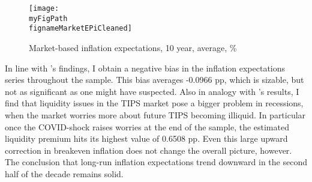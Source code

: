 \documentclass[11pt]{article}
\def \myFigPath {../../figures/}
\renewcommand{\[}{\begin{equation}}
\renewcommand{\]}{\end{equation}}
\def\myFigScale{0.3}
\def\fignameMarketEPiCleaned{cleaned_epi10_2020_07_28}
\begin{document}
\begin{figure}[h!]
\texttt{[image: \\myFigPath \\fignameMarketEPiCleaned]} %
\caption{Market-based inflation expectations, 10 year, average, \%}
\label{epi_cleaned}
\end{figure}

In line with \cite{andreasen2018tips}'s findings, I obtain a negative bias in the inflation expectations series throughout the sample. This bias averages -0.0966 pp, which is sizable, but not as significant as one might have suspected. Also in analogy with \cite{andreasen2018tips}'s results, I find that liquidity issues in the TIPS market pose a bigger problem in recessions, when the market worries more about future TIPS becoming illiquid. In particular once the COVID-shock raises worries at the end of the sample, the estimated liquidity premium hits its highest value of 0.6508 pp. Even this large upward correction in breakeven inflation does not change the overall picture, however. The conclusion that long-run inflation expectations trend downward in the second half of the decade remains solid. 
\end{document}

